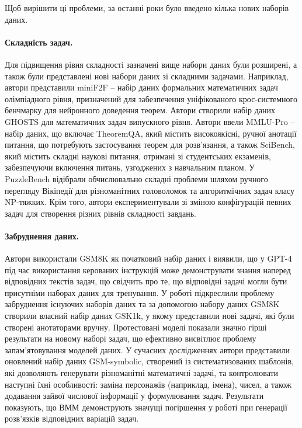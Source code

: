 Щоб вирішити ці проблеми, за останні роки було введено кілька нових наборів даних.

\paragraph{Складність задач.} Для підвищення рівня складності зазначені вище набори даних були розширені, а також були представлені нові набори даних зі складними задачами. Наприклад, автори \cite{zheng2022minif2fcrosssystembenchmarkformal} представили miniF2F -- набір даних формальних математичних задач олімпіадного рівня, призначений для забезпечення уніфікованого крос-системного бенчмарку для нейронного доведення теорем. Автори \cite{frieder2023mathematicalcapabilitieschatgpt} створили набір даних GHOSTS для математичних задач випускного рівня. Автори \cite{wang2024mmluprorobustchallengingmultitask} ввели MMLU-Pro -- набір даних, що включає TheoremQA, який містить високоякісні, ручної анотації питання, що потребують застосування теорем для розв'язання, а також SciBench, який містить складні наукові питання, отримані зі студентських екзаменів, забезпечуючи включення питань, узгоджених з навчальним планом. У PuzzleBench \cite{mittal2024puzzlebenchllmssolvechallenging} відібрали обчислювально складні проблеми шляхом ручного перегляду Вікіпедії для різноманітних головоломок та алгоритмічних задач класу NP-тяжких. Крім того, автори експериментували зі зміною конфігурацій певних задач для створення різних рівнів складності завдань.

\paragraph{Забруднення даних.} Автори \cite{golchin2024timetravelllmstracing} використали GSM8K як початковий набір даних і виявили, що у GPT-4 під час використання керованих інструкцій може демонструвати знання наперед відповідних текстів задач, що свідчить про те, що відповідні задачі могли бути присутніми наборах даних для тренування. У роботі \cite{zhang2024carefulexaminationlargelanguage} підкреслили проблему забруднення існуючих наборів даних та за допомогою набору даних GSM8K створили власний набір даних GSK1k, у якому представили нові задачі, які були створені анотаторами вручну. Протестовані моделі показали значно гірші результати на новому наборі задач, що ефективно висвітлює проблему запам'ятовування моделей даних. У сучасних дослідженнях \cite{mirzadeh2024gsmsymbolicunderstandinglimitationsmathematical} автори представили оновлений набір даних GSM-symbolic, створений із систематизованих шаблонів, які дозволяють генерувати різноманітні математичні задачі, та контролювати наступні їхні особливості: заміна персонажів (наприклад, імена), чисел, а також додавання зайвої числової інформації у формулювання задач. Результати показують, що ВММ демонструють значущі погіршення у роботі при генерації розв'язків відповідних варіацій задач.


